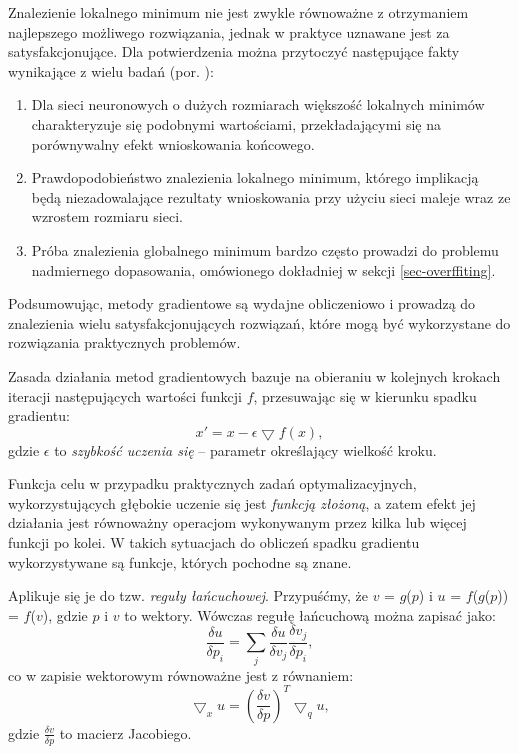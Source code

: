 Znalezienie lokalnego minimum nie jest zwykle równoważne z otrzymaniem najlepszego możliwego rozwiązania, jednak w praktyce uznawane jest za satysfakcjonujące. Dla potwierdzenia można przytoczyć następujące fakty wynikające z wielu badań (por. \cite{DBLP:journals/corr/ChoromanskaHMAL14}):
\begin{enumerate}
	\item Dla sieci neuronowych o dużych rozmiarach większość lokalnych minimów charakteryzuje się podobnymi wartościami, przekładającymi się na porównywalny efekt wnioskowania końcowego.
	\item Prawdopodobieństwo znalezienia lokalnego minimum, którego implikacją będą niezadowalające rezultaty wnioskowania przy użyciu sieci maleje wraz ze wzrostem rozmiaru sieci.
	\item Próba znalezienia globalnego minimum bardzo często prowadzi do problemu nadmiernego dopasowania, omówionego dokładniej w sekcji \ref{sec-overffiting}.
\end{enumerate}

Podsumowując, metody gradientowe są wydajne obliczeniowo i prowadzą do znalezienia wielu satysfakcjonujących rozwiązań, które mogą być wykorzystane do rozwiązania praktycznych problemów. 

Zasada działania metod gradientowych bazuje na obieraniu w kolejnych krokach iteracji następujących wartości funkcji $f$, przesuwając się w kierunku spadku gradientu:
\begin{equation}
x' = x - \epsilon \bigtriangledown f(x),
\end{equation} 
gdzie $\epsilon$ to \textit{szybkość uczenia się} -- parametr określający wielkość kroku. 

Funkcja celu w przypadku praktycznych zadań optymalizacyjnych, wykorzystujących głębokie uczenie się jest \textit{funkcją złożoną}, a zatem efekt jej działania jest równoważny operacjom wykonywanym przez kilka lub więcej funkcji po kolei. W takich sytuacjach do obliczeń spadku gradientu wykorzystywane są funkcje, których pochodne są znane.

Aplikuje się je do tzw. \textit{reguły łańcuchowej}. Przypuśćmy, że $v$ = $g$($p$) i $u$ = $f$($g$($p$)) = $f$($v$), gdzie $p$ i $v$ to wektory. Wówczas regułę łańcuchową można zapisać jako:
\begin{equation}
\frac{\delta u}{\delta p_i} = \sum_{j} \frac{\delta u}{\delta v_j} \frac{\delta v_j}{\delta p_i}, 
\end{equation}
co w zapisie wektorowym równoważne jest z równaniem:
\begin{equation}
\label{regLancuch}
\bigtriangledown_x u = (\frac{\delta v}{\delta p})^T \bigtriangledown_q u, 
\end{equation}
gdzie $\frac{\delta v}{\delta p}$ to macierz Jacobiego. 

